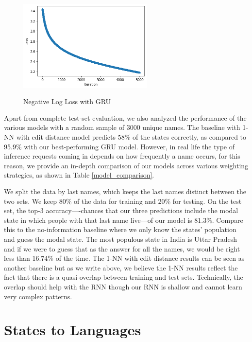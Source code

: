 \documentclass[11pt,  letterpaper]{article}
\begin{document}
\begin{figure}[!htb]
  \centering
  \caption{Negative Log Loss with GRU}
  \includegraphics[width=0.6\textwidth,keepaspectratio]{figs/loss_gru.png}
  \label{fig3:gru_loss}
\end{figure}


Apart from complete test-set evaluation, we also analyzed the performance of the various models with a random sample of 3000 unique names. The baseline with 1-NN with edit distance model predicts 58\% of the states correctly, as compared to 95.9\% with our best-performing GRU model. However, in real life the type of inference requests coming in depends on how frequently a name occurs, for this reason, we provide an in-depth comparison of our models across various weighting strategies, as shown in Table \ref{model_comparison}.






We split the data by last names, which keeps the last names distinct between the two sets. We keep 80\% of the data for training and 20\% for testing. On the test set, the top-3 accuracy—-chances that our three predictions include the modal state in which people with that last name live—of our model is 81.3\%. Compare this to the no-information baseline where we only know the states' population and guess the modal state. The most populous state in India is Uttar Pradesh and if we were to guess that as the answer for all the names, we would be right less than 16.74\% of the time. The 1-NN with edit distance results can be seen as another baseline but as we write above, we believe the 1-NN results reflect the fact that there is a quasi-overlap between training and test sets. Technically, the overlap should help with the RNN though our RNN is shallow and cannot learn very complex patterns. 

\section{States to Languages}
\end{document}
